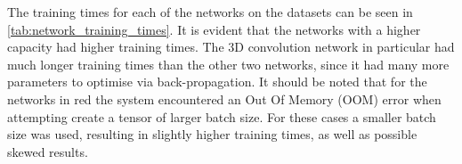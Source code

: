 The training times for each of the networks on the datasets can be seen in \cref{tab:network_training_times}. It is evident that the networks with a higher capacity had higher training times. The 3D convolution network in particular had much longer training times than the other two networks, since it had many more parameters to optimise via back-propagation. It should be noted that for the networks in \color{red} red \color{black} the system encountered an Out Of Memory (OOM) error when attempting create a tensor of larger batch size. For these cases a smaller batch size was used, resulting in slightly higher training times, as well as possible skewed results.